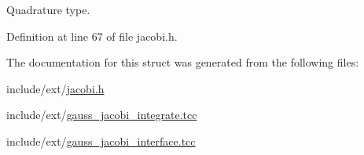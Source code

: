 Quadrature type. 



Definition at line 67 of file jacobi.\+h.



The documentation for this struct was generated from the following files\+:\begin{DoxyCompactItemize}
\item 
include/ext/\hyperlink{jacobi_8h}{jacobi.\+h}\item 
include/ext/\hyperlink{gauss__jacobi__integrate_8tcc}{gauss\+\_\+jacobi\+\_\+integrate.\+tcc}\item 
include/ext/\hyperlink{gauss__jacobi__interface_8tcc}{gauss\+\_\+jacobi\+\_\+interface.\+tcc}\end{DoxyCompactItemize}
